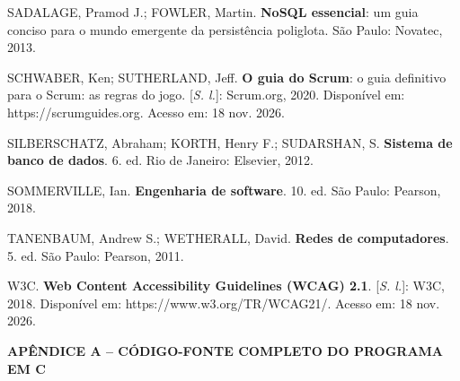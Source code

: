 \documentclass[12pt,a4paper,oneside]{report}
\newcommand{\titulocentral}[1]{%
  \begin{center}\textbf{\MakeUppercase{#1}}\end{center}\vspace{0.8\baselineskip}}
\begin{document}
{SADALAGE, Pramod J.; FOWLER, Martin. \textbf{NoSQL essencial}: um guia conciso para o mundo emergente da
persistência poliglota. São Paulo: Novatec, 2013.

SCHWABER, Ken; SUTHERLAND, Jeff. \textbf{O guia do Scrum}: o guia definitivo para o Scrum: as regras do
jogo. [\textit{S. l.}]: Scrum.org, 2020. Disponível em: https://scrumguides.org. Acesso em: 18 nov. 2026.

SILBERSCHATZ, Abraham; KORTH, Henry F.; SUDARSHAN, S. \textbf{Sistema de banco de dados}. 6. ed. Rio de
Janeiro: Elsevier, 2012.

SOMMERVILLE, Ian. \textbf{Engenharia de software}. 10. ed. São Paulo: Pearson, 2018.

TANENBAUM, Andrew S.; WETHERALL, David. \textbf{Redes de computadores}. 5. ed. São Paulo: Pearson, 2011.

W3C. \textbf{Web Content Accessibility Guidelines (WCAG) 2.1}. [\textit{S. l.}]: W3C, 2018. Disponível
em: https://www.w3.org/TR/WCAG21/. Acesso em: 18 nov. 2026.
\par}

\clearpage
{}
{}
\titulocentral{Apêndice A -- Código-fonte completo do programa em C}












\end{document}
